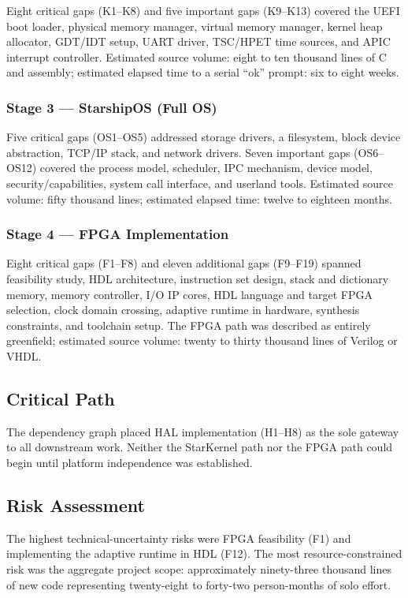Eight critical gaps (K1--K8) and five important gaps (K9--K13) covered
the UEFI boot loader, physical memory manager, virtual memory manager,
kernel heap allocator, GDT/IDT setup, UART driver, TSC/HPET time
sources, and APIC interrupt controller. Estimated source volume: eight
to ten thousand lines of C and assembly; estimated elapsed time to a
serial ``ok'' prompt: six to eight weeks.

\subsubsection{Stage 3 — StarshipOS (Full OS)}

Five critical gaps (OS1--OS5) addressed storage drivers, a filesystem,
block device abstraction, TCP/IP stack, and network drivers. Seven
important gaps (OS6--OS12) covered the process model, scheduler, IPC
mechanism, device model, security/capabilities, system call interface,
and userland tools. Estimated source volume: fifty thousand lines;
estimated elapsed time: twelve to eighteen months.

\subsubsection{Stage 4 — FPGA Implementation}

Eight critical gaps (F1--F8) and eleven additional gaps (F9--F19) spanned
feasibility study, HDL architecture, instruction set design, stack and
dictionary memory, memory controller, I/O IP cores, HDL language and
target FPGA selection, clock domain crossing, adaptive runtime in
hardware, synthesis constraints, and toolchain setup. The FPGA path
was described as entirely greenfield; estimated source volume: twenty to
thirty thousand lines of Verilog or VHDL.

\subsection{Critical Path}

The dependency graph placed HAL implementation (H1--H8) as the sole
gateway to all downstream work. Neither the StarKernel path nor the FPGA
path could begin until platform independence was established.

\subsection{Risk Assessment}

The highest technical-uncertainty risks were FPGA feasibility (F1) and
implementing the adaptive runtime in HDL (F12). The most resource-constrained
risk was the aggregate project scope: approximately ninety-three thousand
lines of new code representing twenty-eight to forty-two person-months of
solo effort.

